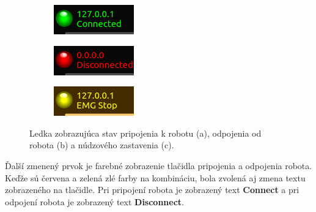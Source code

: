 \begin{figure}[!htbp]
	\begin{subfigure}{0.3\textwidth}
		\includegraphics[width=\textwidth]{img/led-connected.png}
	\end{subfigure}
	\hfill
	\begin{subfigure}{0.3\textwidth}
		\includegraphics[width=\textwidth]{img/led-disconnected.png}
	\end{subfigure}
	\hfill
	\begin{subfigure}{0.3\textwidth}
		\includegraphics[width=\textwidth]{img/led-emg-stop.png}
	\end{subfigure}
	\caption{ Ledka zobrazujúca stav pripojenia k robotu (a), odpojenia od robota (b) a núdzového zastavenia (c).}
	\label{fig:led}
\end{figure}

Ďalší zmenený prvok je farebné zobrazenie tlačidla pripojenia a odpojenia robota. Keďže sú červena a zelená zlé farby na
kombináciu, bola zvolená aj zmena textu zobrazeného na tlačidle. Pri pripojení robota je zobrazený text \textbf{Connect}
a pri odpojení robota je zobrazený text \textbf{Disconnect}.

